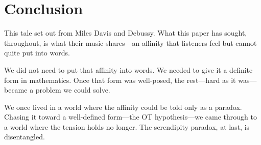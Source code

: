 \section{Conclusion}\label{sec:conclusion}

This tale set out from Miles Davis and Debussy. What this paper has
sought, throughout, is what their music shares---an affinity that
listeners feel but cannot quite put into words.

We did not need to put that affinity into words. We needed to give it
a definite form in mathematics. Once that form was well-posed, the
rest---hard as it was---became a problem we could solve.

We once lived in a world where the affinity could be told only as a
paradox. Chasing it toward a well-defined form---the OT
hypothesis---we came through to a world where the tension holds no
longer. The serendipity paradox, at last, is disentangled.
